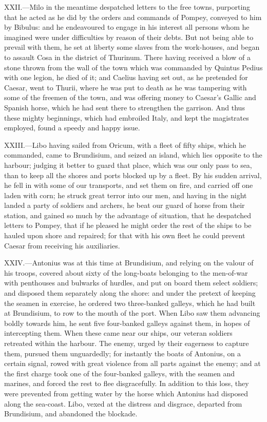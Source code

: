 XXII.—Milo in the meantime despatched letters to the free towns,
purporting that he acted as he did by the orders and commands of Pompey,
conveyed to him by Bibulus: and he endeavoured to engage in his interest
all persons whom he imagined were under difficulties by reason of their
debts. But not being able to prevail with them, he set at liberty some
slaves from the work-houses, and began to assault Cosa in the district
of Thurinum. There having received a blow of a stone thrown from the
wall of the town which was commanded by Quintus Pedius with one legion,
he died of it; and Caelius having set out, as he pretended for Caesar,
went to Thurii, where he was put to death as he was tampering with some
of the freemen of the town, and was offering money to Caesar's Gallic
and Spanish horse, which he had sent there to strengthen the garrison.
And thus these mighty beginnings, which had embroiled Italy, and kept
the magistrates employed, found a speedy and happy issue.

XXIII.—Libo having sailed from Oricum, with a fleet of fifty ships,
which he commanded, came to Brundisium, and seized an island, which lies
opposite to the harbour; judging it better to guard that place, which
was our only pass to sea, than to keep all the shores and ports blocked
up by a fleet. By his sudden arrival, he fell in with some of our
transports, and set them on fire, and carried off one laden with corn;
he struck great terror into our men, and having in the night landed a
party of soldiers and archers, he beat our guard of horse from their
station, and gained so much by the advantage of situation, that he
despatched letters to Pompey, that if he pleased he might order the rest
of the ships to be hauled upon shore and repaired; for that with his own
fleet he could prevent Caesar from receiving his auxiliaries.

XXIV.—Antonius was at this time at Brundisium, and relying on the
valour of his troops, covered about sixty of the long-boats belonging to
the men-of-war with penthouses and bulwarks of hurdles, and put on board
them select soldiers; and disposed them separately along the shore: and
under the pretext of keeping the seamen in exercise, he ordered two
three-banked galleys, which he had built at Brundisium, to row to the
mouth of the port. When Libo saw them advancing boldly towards him, he
sent five four-banked galleys against them, in hopes of intercepting
them. When these came near our ships, our veteran soldiers retreated
within the harbour. The enemy, urged by their eagerness to capture them,
pursued them unguardedly; for instantly the boats of Antonius, on a
certain signal, rowed with great violence from all parts against the
enemy; and at the first charge took one of the four-banked galleys, with
the seamen and marines, and forced the rest to flee disgracefully. In
addition to this loss, they were prevented from getting water by the
horse which Antonius had disposed along the sea-coast. Libo, vexed at
the distress and disgrace, departed from Brundisium, and abandoned the
blockade.

